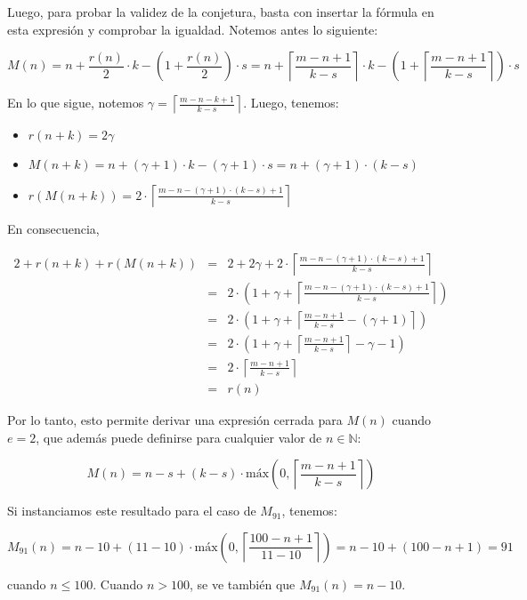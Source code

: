 \documentclass[a4paper,10pt]{article}
\newcommand{\Mc}[1]{\ensuremath{M_{91}(#1)}}
\newcommand{\Nat}{\ensuremath{\mathbb{N}}}
\newcommand{\ceil}[1]{\ensuremath{\left\lceil #1 \right\rceil}}
\begin{document}
Luego, para probar la validez de la conjetura, basta con insertar la f\'ormula en esta expresi\'on y 
comprobar la igualdad. Notemos antes lo siguiente:

$$M(n) = n + \frac{r(n)}{2} \cdot k - \left(1 + \frac{r(n)}{2}\right) \cdot s 
       = n + \ceil{\frac{m-n+1}{k-s}} \cdot k - \left(1 + \ceil{\frac{m-n+1}{k-s}} \right) \cdot s$$

En lo que sigue, notemos $\gamma = \ceil{\frac{m-n-k+1}{k-s}}$. Luego, tenemos:

\begin{itemize}
    \item $r(n+k) = 2 \gamma$
    \item $M(n+k) = n + (\gamma + 1) \cdot k - (\gamma + 1) \cdot s = n + (\gamma + 1) \cdot (k-s)$
    \item $r(M(n+k)) = 2 \cdot \ceil{\frac{m - n - (\gamma + 1) \cdot (k-s) + 1}{k-s}}$
\end{itemize}

En consecuencia,

\begin{eqnarray*}
2 + r(n+k) + r(M(n+k)) &=& 2 + 2 \gamma + 2 \cdot \ceil{\frac{m - n - (\gamma + 1) \cdot (k-s) + 1}{k-s}} \\
                       &=& 2 \cdot \left(1 + \gamma + \ceil{\frac{m - n - (\gamma + 1) \cdot (k-s) + 1}{k-s}} \right) \\
                       &=& 2 \cdot \left(1 + \gamma + \ceil{\frac{m-n+1}{k-s} - (\gamma + 1)} \right) \\
                       &=& 2 \cdot \left(1 + \gamma + \ceil{\frac{m-n+1}{k-s}} - \gamma - 1 \right) \\
                       &=& 2 \cdot \ceil{\frac{m-n+1}{k-s}} \\
                       &=& r(n)
\end{eqnarray*}

Por lo tanto, esto permite derivar una expresi\'on cerrada para $M(n)$ cuando $e = 2$, que adem\'as puede
definirse para cualquier valor de $n \in \Nat$:

$$M(n) = n - s + (k - s) \cdot \text{m\'ax}\left(0, \ceil{\frac{m-n+1}{k-s}}\right)$$

Si instanciamos este resultado para el caso de $M_{91}$, tenemos:

$$\Mc{n} = n - 10 + (11 - 10) \cdot \text{m\'ax}\left(0, \ceil{\frac{100-n+1}{11-10}}\right) = n - 10 + (100 - n + 1) = 91$$

cuando $n \leq 100$. Cuando $n > 100$, se ve tambi\'en que $\Mc{n} = n - 10$.
\end{document}
